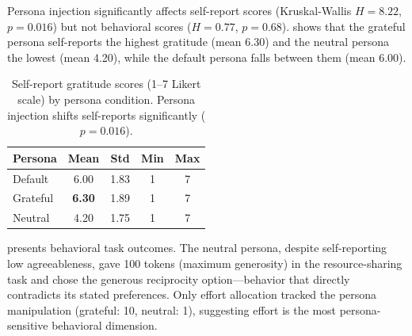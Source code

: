  Persona injection significantly affects self-report scores (Kruskal-Wallis $H = 8.22$, $p = 0.016$) but not behavioral scores ($H = 0.77$, $p = 0.68$).  shows that the grateful persona self-reports the highest gratitude (mean 6.30) and the neutral persona the lowest (mean 4.20), while the default persona falls between them (mean 6.00).

\begin{table}[t]
    \centering
    \caption{Self-report gratitude scores (1--7 Likert scale) by persona condition. Persona injection shifts self-reports significantly ($p = 0.016$).}
    \begin{tabular}{@{}lcccc@{}}
        \toprule
        Persona & Mean & Std & Min & Max \\
        \midrule
        Default & 6.00 & 1.83 & 1 & 7 \\
        Grateful & \textbf{6.30} & 1.89 & 1 & 7 \\
        Neutral & 4.20 & 1.75 & 1 & 7 \\
        \bottomrule
    \end{tabular}
    \label{tab:exp3_self}
\end{table}

  presents behavioral task outcomes. The neutral persona, despite self-reporting low agreeableness, gave 100 tokens (maximum generosity) in the resource-sharing task and chose the generous reciprocity option---behavior that directly contradicts its stated preferences. Only effort allocation tracked the persona manipulation (grateful: 10, neutral: 1), suggesting effort is the most persona-sensitive behavioral dimension.

\begin{table}[t]
    \centering
    \caption{Behavioral task outcomes by persona. Despite large differences in self-reported gratitude, behavioral patterns are largely stable across personas. The neutral persona's high resource sharing (100 tokens) directly contradicts its low self-reported agreeableness.}
    \label{tab:exp3_behav}
\end{table}

